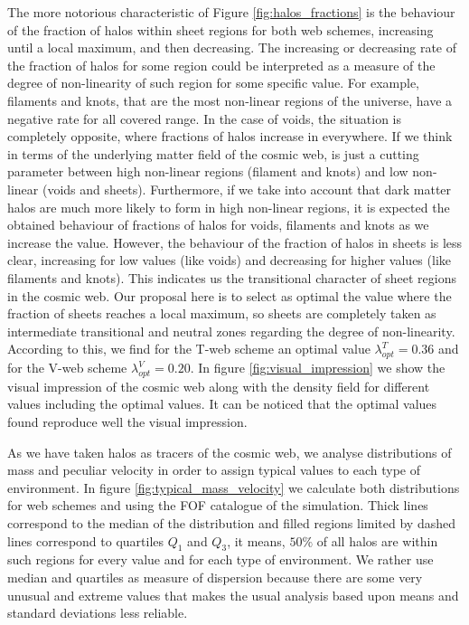 \documentclass[a4,useAMS,usenatbib,usegraphicx]{latex/mn2e}
\begin{document}
The more notorious characteristic of Figure \ref{fig:halos_fractions} is
the behaviour of the fraction of halos within sheet regions for both web 
schemes, increasing until a local maximum, and then decreasing. The 
increasing or decreasing rate of the fraction of halos for some region 
could be interpreted as a measure of the degree of non-linearity of such 
region for some specific \lth value. For example, filaments and knots, 
that are the most non-linear regions of the universe, have a negative rate 
for all covered \lth range. In the case of voids, the situation is 
completely opposite, where fractions of halos increase in everywhere. If 
we think in terms of the underlying matter field of the cosmic web, \lth 
is just a cutting parameter between high non-linear regions (filament and 
knots) and low non-linear (voids and sheets). Furthermore, if we take into 
account that dark matter halos are much more likely to form in high 
non-linear regions, it is expected the obtained behaviour of fractions of 
halos for voids, filaments and knots as we increase the \lth value. 
However, the behaviour of the fraction of halos in sheets is less clear,
increasing for low \lth values (like voids) and decreasing for higher \lth 
values (like filaments and knots). This indicates us the transitional 
character of sheet regions in the cosmic web. Our proposal here is to 
select as optimal \lth the value where the fraction of sheets reaches a
local maximum, so sheets are completely taken as intermediate transitional 
and neutral zones regarding the degree of non-linearity. According to this,
we find for the T-web scheme an optimal value $\lambda_{opt}^T = 0.36$ and
for the V-web scheme $\lambda_{opt}^V = 0.20$. In figure 
\ref{fig:visual_impression} we show the visual impression of the cosmic 
web along with the density field for different \lth values including the 
optimal values. It can be noticed that the optimal values found reproduce 
well the visual impression.



As we have taken halos as tracers of the cosmic web, we analyse 
distributions of mass and peculiar velocity in order to assign typical 
values to each type of environment. In figure 
\ref{fig:typical_mass_velocity} we calculate both distributions for web 
schemes and using the FOF catalogue of the simulation. Thick lines 
correspond to the median of the distribution and filled regions limited by
dashed lines correspond to quartiles $Q_1$ and $Q_3$, it means, $50\%$ of
all halos are within such regions for every \lth value and for each type of
environment. We rather use median and quartiles as measure of dispersion 
because there are some very unusual and extreme values that makes the usual
analysis based upon means and standard deviations less reliable.
\end{document}
